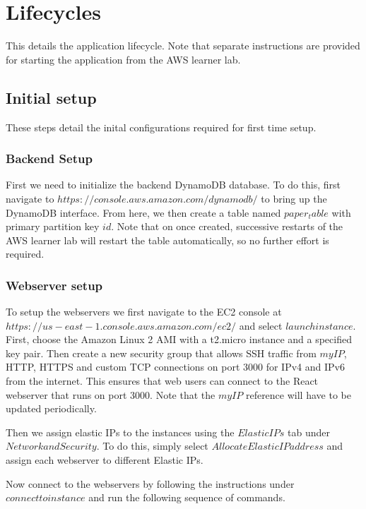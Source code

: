 \documentclass[12pt]{article}
\begin{document}
\section{Lifecycles}

This details the application lifecycle. Note that separate instructions are provided for starting the application from the AWS learner lab. 

\subsection{Initial setup}

These steps detail the inital configurations required for first time setup.

\subsubsection{Backend Setup}

First we need to initialize the backend DynamoDB database. To do this, first navigate to $https://console.aws.amazon.com/dynamodb/$ to bring up the DynamoDB interface. From here, we then create a table named $paper_table$ with primary partition key $id$. Note that on once created, successive restarts of the AWS learner lab will restart the table automatically, so no further effort is required. 

\subsubsection{Webserver setup}

To setup the webservers we first navigate to the EC2 console at $https://us-east-1.console.aws.amazon.com/ec2/$ and select $launch instance$. First, choose the Amazon Linux 2 AMI with a t2.micro instance and a specified key pair. Then create a new security group that allows SSH traffic from $myIP$, HTTP, HTTPS and custom TCP connections on port 3000 for IPv4 and IPv6 from the internet. This ensures that web users can connect to the React webserver that runs on port 3000. Note that the $myIP$ reference will have to be updated periodically. 

Then we assign elastic IPs to the instances using the $Elastic IPs$ tab under $Network and Security$. To do this, simply select $Allocate Elastic IP address$ and assign each webserver to different Elastic IPs.

Now connect to the webservers by following the instructions under $connect to instance$ and run the following sequence of commands. 
\end{document}
